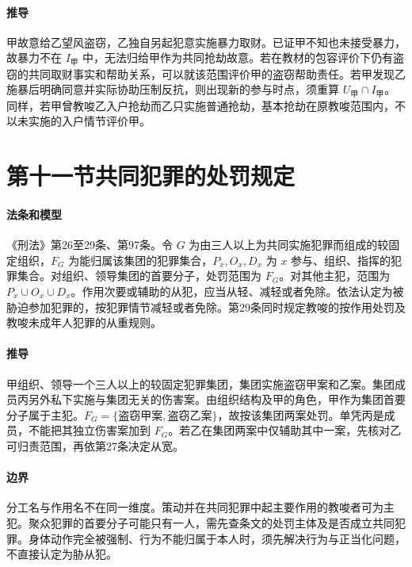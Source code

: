\paragraph{推导}
甲故意给乙望风盗窃，乙独自另起犯意实施暴力取财。已证甲不知也未接受暴力，故暴力不在 \(I_{\text{甲}}\) 中，无法归给甲作为共同抢劫故意。若在教材的包容评价下仍有盗窃的共同取财事实和帮助关系，可以就该范围评价甲的盗窃帮助责任。若甲发现乙施暴后明确同意并实际协助压制反抗，则出现新的参与时点，须重算 \(U_{\text{甲}}\cap I_{\text{甲}}\)。同样，若甲曾教唆乙入户抢劫而乙只实施普通抢劫，基本抢劫在原教唆范围内，不以未实施的入户情节评价甲。

\section{第十一节\quad 共同犯罪的处罚规定}

\paragraph{法条和模型}
《刑法》第26至29条、第97条。令 \(G\) 为由三人以上为共同实施犯罪而组成的较固定组织，\(F_G\) 为能归属该集团的犯罪集合，\(P_x,O_x,D_x\) 为 \(x\) 参与、组织、指挥的犯罪集合。对组织、领导集团的首要分子，处罚范围为 \(F_G\)。对其他主犯，范围为 \(P_x\cup O_x\cup D_x\)。作用次要或辅助的从犯，应当从轻、减轻或者免除。依法认定为被胁迫参加犯罪的，按犯罪情节减轻或者免除。第29条同时规定教唆的按作用处罚及教唆未成年人犯罪的从重规则。

\paragraph{推导}
甲组织、领导一个三人以上的较固定犯罪集团，集团实施盗窃甲案和乙案。集团成员丙另外私下实施与集团无关的伤害案。由组织结构及甲的角色，甲作为集团首要分子属于主犯。\(F_G=\{\text{盗窃甲案},\text{盗窃乙案}\}\)，故按该集团两案处罚。单凭丙是成员，不能把其独立伤害案加到 \(F_G\)。若乙在集团两案中仅辅助其中一案，先核对乙可归责范围，再依第27条决定从宽。

\paragraph{边界}
分工名与作用名不在同一维度。策动并在共同犯罪中起主要作用的教唆者可为主犯。聚众犯罪的首要分子可能只有一人，需先查条文的处罚主体及是否成立共同犯罪。身体动作完全被强制、行为不能归属于本人时，须先解决行为与正当化问题，不直接认定为胁从犯。


